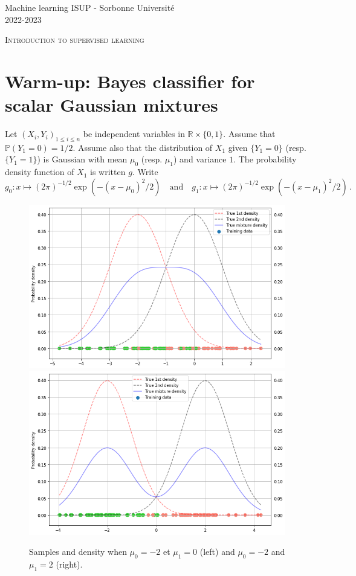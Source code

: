 \documentclass[a4paper,10pt,fleqn]{article}
\newcommand{\eqsp}{\,}
\newcommand{\1}{\ensuremath{\mathbbm{1}}}
\begin{document}
\noindent Machine learning \hfill ISUP - Sorbonne Universit\'e \\
 2022-2023

\noindent\hrulefill

\begin{center}
\textsc{Introduction to supervised learning}
\end{center}
\hrulefill

\medskip


\section{Warm-up: Bayes classifier for scalar Gaussian mixtures}
Let $(X_i,Y_i)_{1\leqslant i\leqslant n}$ be independent variables in $\mathbb{R}\times \{0,1\}$. Assume that  $\mathbb{P}(Y_1 = 0) = 1/2$. Assume also that the distribution of $X_1$ given $\{Y_1= 0\}$ (resp. $\{Y_1= 1\}$) is Gaussian with mean $\mu_0$ (resp. $\mu_1$) and variance $1$. The probability density function of $X_1$ is written $g$. Write
$$
g_0: x \mapsto (2\pi)^{-1/2}\exp(-(x-\mu_0)^2/2)\quad\mathrm{and} \quad g_1: x \mapsto (2\pi)^{-1/2}\exp(-(x-\mu_1)^2/2)\eqsp.
$$
\begin{figure}[h!]
\begin{center}
\includegraphics[scale=0.3]{mu0_mum2.png}
\includegraphics[scale=0.3]{mu2_mum2.png}
\caption{Samples and density when   $\mu_0 = -2$ et $\mu_1 = 0$ (left) and $\mu_0 = -2$ and $\mu_1 = 2$ (right).}
\end{center}
\end{figure}
\end{document}
